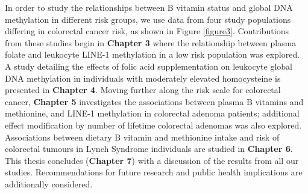 \noindent In order to study the relationships between B vitamin status and global DNA methylation in different risk groups, we use data from four study populations differing in colorectal cancer risk, as shown in Figure \ref{figure3}. Contributions from these studies begin in \textbf{Chapter 3} where the relationship between plasma folate and leukocyte LINE-1 methylation in a low risk population was explored. A study detailing the effects of folic acid supplementation on leukocyte global DNA methylation in individuals with moderately elevated homocysteine is presented in \textbf{Chapter 4}. Moving further along the risk scale for colorectal cancer, \textbf{Chapter 5} investigates the associations between plasma B vitamins and methionine, and LINE-1 methylation in colorectal adenoma patients; additional effect modification by number of lifetime colorectal adenomas was also explored. Associations between dietary B vitamin and methionine intake and risk of colorectal tumours in Lynch Syndrome individuals are 
studied in \textbf{Chapter 6}. This thesis concludes (\textbf{Chapter 7}) with a discussion of the results from all our studies. Recommendations for future research and public health implications are additionally considered. 
 
